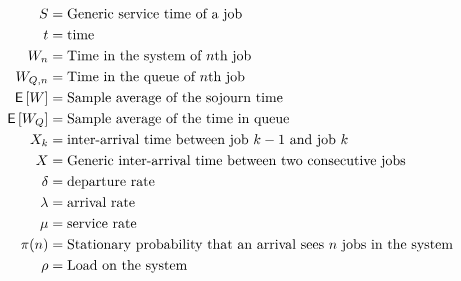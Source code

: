 \begin{align*}
  S &= \text{Generic service time of a job} \\
  t &= \text{time} \\
  W_n &= \text{Time in the system of $n$th job} \\
  W_{Q,n} &= \text{Time in the queue of $n$th job} \\
  \,\mathsf{E}\left[W\right] &= \text{Sample average of the sojourn time} \\
  \,\mathsf{E}\left[W_Q\right] &= \text{Sample average of the time in queue} \\
  X_k &= \text{inter-arrival time between job $k-1$ and job  $k$} \\
  X &= \text{Generic inter-arrival time between two consecutive jobs} \\
  \delta &= \text{departure rate} \\
  \lambda &= \text{arrival rate} \\
  \mu &= \text{service rate} \\
  \pi(n)  &= \text{Stationary probability that an arrival sees $n$ jobs in the system} \\
  \rho &= \text{Load on the system} \\
\end{align*}
